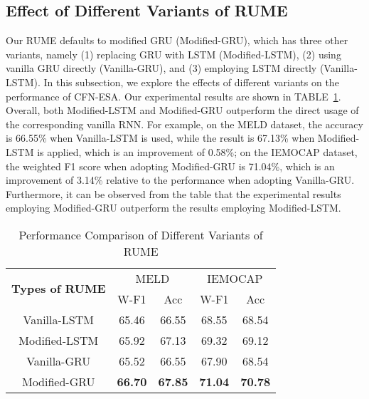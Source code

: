 \documentclass[journal]{IEEEtran}
\begin{document}
\subsection{Effect of Different Variants of RUME}
Our RUME defaults to modified GRU (Modified-GRU), which has three other variants, namely (1) replacing GRU with LSTM (Modified-LSTM), (2) using vanilla GRU directly (Vanilla-GRU), and (3) employing LSTM directly (Vanilla-LSTM). In this subsection, we explore the effects of different variants on the performance of CFN-ESA. Our experimental results are shown in TABLE~\ref{tab:rume_variants}. Overall, both Modified-LSTM and Modified-GRU outperform the direct usage of the corresponding vanilla RNN. For example, on the MELD dataset, the accuracy is 66.55\% when Vanilla-LSTM is used, while the result is 67.13\% when Modified-LSTM is applied, which is an improvement of 0.58\%; on the IEMOCAP dataset, the weighted F1 score when adopting Modified-GRU is 71.04\%, which is an improvement of 3.14\% relative to the performance when adopting Vanilla-GRU. Furthermore, it can be observed from the table that the experimental results employing Modified-GRU outperform the results employing Modified-LSTM. 
\begin{table}[htbp]
    \centering
    \renewcommand{\arraystretch}{1.0}
    \setlength{\tabcolsep}{8pt}
    \caption{Performance Comparison of Different Variants of RUME}
\begin{tabular}{c|cc|cc}
    \hline
    \multirow{2}{*}{\textbf{Types of RUME}} &\multicolumn{2}{c|}{MELD} &\multicolumn{2}{c}{IEMOCAP}\\
&W-F1 &Acc &W-F1 &Acc\\ 
    \hline 
	Vanilla-LSTM &65.46 &66.55 &68.55 &68.54 \\
    Modified-LSTM &65.92 &67.13 &69.32 &69.12 \\
	\hline
	Vanilla-GRU &65.52 &66.55 &67.90 &68.54 \\
    Modified-GRU &\textbf{66.70} &\textbf{67.85} &\textbf{71.04} &\textbf{70.78} \\
	\hline
    \end{tabular}
\label{tab:rume_variants}
\end{table}
\end{document}
